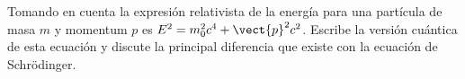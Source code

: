 \documentclass[../main.tex]{subfiles}
\begin{document}
\begin{problema}
	Tomando en cuenta la expresión relativista de la energía para una partícula
	de masa \(m\) y momentum \(p\) es \(E^{2} = m_{0}^{2}c^{4} + \vect{p}^{2}c^{2}\).
	Escribe la versión cuántica de esta ecuación y discute la principal diferencia
	que existe con la ecuación de Schrödinger.
\end{problema}
\end{document}
